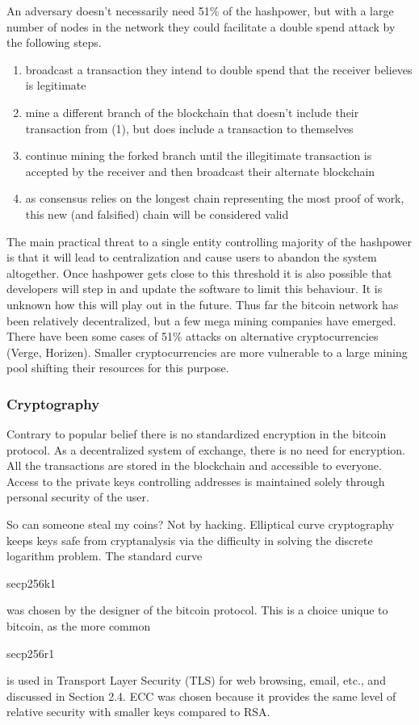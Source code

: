 An adversary doesn't necessarily need 51\% of the hashpower, but with a large number of nodes in the network they could facilitate a double spend attack by the following steps.
\begin{enumerate}
	\item broadcast a transaction they intend to double spend that the receiver believes is legitimate
	\item mine a different branch of the blockchain that doesn't include their transaction from (1), but does include a transaction to themselves
	\item continue mining the forked branch until the illegitimate transaction is accepted by the receiver and then broadcast their alternate blockchain
	\item as consensus relies on the longest chain representing the most proof of work, this new (and falsified) chain will be considered valid
\end{enumerate}

The main practical threat to a single entity controlling majority of the hashpower is that it will lead to centralization and cause users to abandon the system altogether. Once hashpower gets close to this threshold it is also possible that developers will step in and update the software to limit this behaviour. It is unknown how this will play out in the future. Thus far the bitcoin network has been relatively decentralized, but a few mega mining companies have emerged. There have been some cases of 51\% attacks on alternative cryptocurrencies (Verge, Horizen). Smaller cryptocurrencies are more vulnerable to a large mining pool shifting their resources for this purpose.

\subsubsection*{Cryptography}\label{Se:bitcoinCryptography}
Contrary to popular belief there is no standardized encryption in the bitcoin protocol. As a decentralized system of exchange, there is no need for encryption. All the transactions are stored in the blockchain and accessible to everyone. Access to the private keys controlling addresses is maintained solely through personal security of the user. 

So can someone steal my coins? Not by hacking. Elliptical curve cryptography keeps keys safe from cryptanalysis via the difficulty in solving the discrete logarithm problem. The standard curve \begin{code}secp256k1\end{code} was chosen by the designer of the bitcoin protocol. This is a choice unique to bitcoin, as the more common \begin{code}secp256r1\end{code} is used in Transport Layer Security (TLS) for web browsing, email, etc., and discussed in Section 2.4. ECC was chosen because it provides the same level of relative security with smaller keys compared to RSA.

